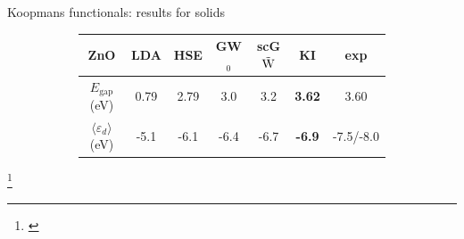 \documentclass[xcolor=table,aspectratio=169]{beamer}
\newcommand\blfootcite[1]{%
  \begingroup
  \renewcommand\thefootnote{}\footnote{\hspace{-4ex}\cite{#1}}%
  \addtocounter{footnote}{-1}%
  \endgroup
}
\numberwithin{equation}{section}
\begin{document}
\begin{frame}{Koopmans functionals: results for solids}
\begin{figure}[t]
\begin{subfigure}{0.3\textwidth}
      \end{subfigure}
      \begin{subfigure}{\textwidth} %
         \centering
         \begin{tabular}{c S[table-format = 2.2] S[table-format = 2.2] S[table-format = 2.2] S[table-format = 2.2] >{\color{seaborn_red}\bfseries}S[table-format = 2.2] S[table-format = 2.2]}
            ZnO                                  & {LDA} & {HSE} & {GW$_0$} & {scG$\tilde{\rm W}$} & {KI} & {exp}       \\
            \hline
            $E_\mathrm{gap}$ (eV)                & 0.79  & 2.79  & 3.0      & 3.2                  & 3.62 & 3.60        \\
            $\langle \varepsilon_d \rangle$ (eV) & -5.1  & -6.1  & -6.4     & -6.7                 & -6.9 & {-7.5/-8.0} \\
         \end{tabular}
      \end{subfigure}
   \end{figure}
   \blfootcite{Colonna2022}
\end{frame}
\end{document}
